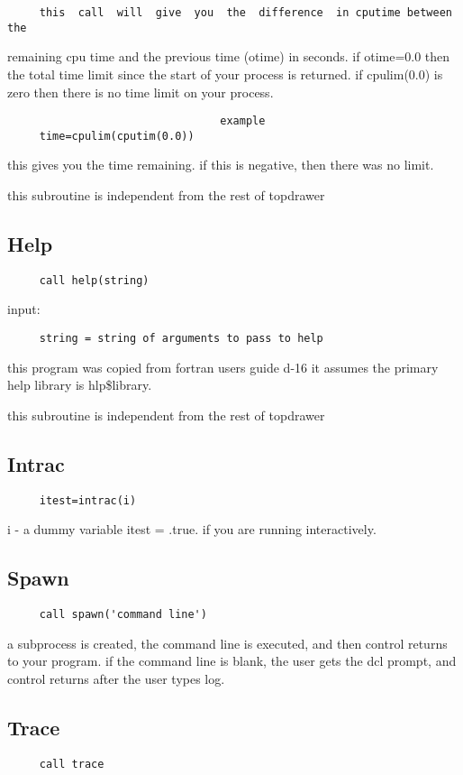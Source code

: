 \begin{verbatim}
     this  call  will  give  you  the  difference  in cputime between the
\end{verbatim}
remaining cpu  time  and  the  previous  time  (otime)  in  seconds.   if
otime=0.0  then  the  total time limit since the start of your process is
returned.  if cpulim(0.0) is zero then there is no  time  limit  on  your
process.  

\begin{verbatim}
                                 example
     time=cpulim(cputim(0.0)) 
\end{verbatim}
this  gives  you the time remaining.  if this is negative, then there was
no limit.  

this subroutine is independent from the rest of topdrawer 
\subsection{Help}
\begin{verbatim}
     call help(string) 
\end{verbatim}
input:  
\begin{verbatim}
     string = string of arguments to pass to help 
\end{verbatim}
this  program  was  copied  from  fortran users guide d-16 it assumes the
primary help library is hlp\$library.  

this subroutine is independent from the rest of topdrawer 
\subsection{Intrac}
\begin{verbatim}
     itest=intrac(i) 
\end{verbatim}
i - a dummy variable 
itest = .true.  if you are running interactively.  
\subsection{Spawn}
\begin{verbatim}
     call spawn('command line') 
\end{verbatim}
a  subprocess  is created, the command line is executed, and then control
returns to your program.  if the command line is blank, the user gets the
dcl prompt, and control returns after the user types log.  
\subsection{Trace}
\begin{verbatim}
     call trace 
\end{verbatim}

